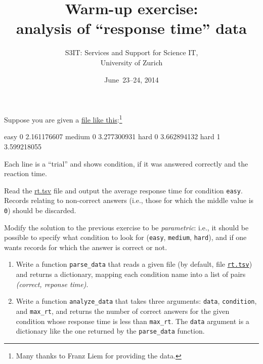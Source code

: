 \documentclass[english,serif,mathserif,xcolor=pdftex,dvipsnames,table]{beamer}
\title[Warm-up]{%
  Warm-up exercise: \\
  analysis of ``response time'' data
}
\author[S3IT]{%
  S3IT: Services and Support for Science IT, \\
  University of Zurich
}
\date{June~23--24, 2014}
\begin{document}
\maketitle


\begin{frame}[fragile]
  Suppose you are given a
  \href{https://raw.github.com/gc3-uzh-ch/python-course/master/rt.tsv}{file
    like this}:\footnote{%
  Many thanks to Franz Liem for providing the data.
}%
\begin{semiverbatim}
easy	0	2.161176607
medium	0	3.277300931
hard	0	3.662894132
hard	1	3.599218055
\end{semiverbatim}

\+
Each line is a ``trial'' and shows condition, if it was answered
correctly and the reaction time.
\end{frame}


\begin{frame}
  \begin{exercise}
    Read the
    \href{https://raw.github.com/gc3-uzh-ch/python-course/master/rt.tsv}{rt.tsv}
    file and output the average response time for condition
    \texttt{easy}.  Records relating to non-correct answers (i.e.,
    those for which the middle value is \texttt{0}) should be
    discarded.
  \end{exercise}

  \+
  \begin{exercise}
    Modify the solution to the previous exercise to be
    \emph{parametric}: i.e., it should be possible to specify what
    condition to look for (\texttt{easy}, \texttt{medium},
    \texttt{hard}), and if one wants records for which the answer is
    correct or not.
  \end{exercise}
\end{frame}


\begin{frame}
  \begin{exercise}
    \begin{enumerate}
    \item
      Write a function \texttt{parse\_data} that reads a given file (by default, file
      \href{https://raw.github.com/gc3-uzh-ch/python-course/master/rt.tsv}{\texttt{rt.tsv}})
      and returns a dictionary, mapping each condition name into a list
      of pairs \emph{(correct, reponse time)}.

    \item
      Write a function \texttt{analyze\_data} that takes three
      arguments: \texttt{data}, \texttt{condition}, and
      \texttt{max\_rt}, and returns the number of correct answers for
      the given condition whose response time is less than
      \texttt{max\_rt}.  The \texttt{data} argument is a dictionary
      like the one returned by the \texttt{parse\_data} function.
    \end{enumerate}
  \end{exercise}
\end{frame}
\end{document}
